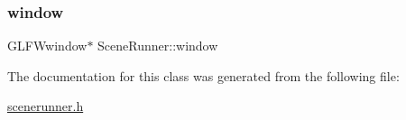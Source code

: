 \mbox{\label{class_scene_runner_a3b5f5327fe99c632c23b24e070956412}} 
\subsubsection{\texorpdfstring{window}{window}}
{\footnotesize\ttfamily G\+L\+F\+Wwindow$\ast$ Scene\+Runner\+::window\hspace{0.3cm}{\ttfamily [private]}}



The documentation for this class was generated from the following file\+:\begin{DoxyCompactItemize}
\item 
\mbox{\hyperlink{scenerunner_8h}{scenerunner.\+h}}\end{DoxyCompactItemize}
